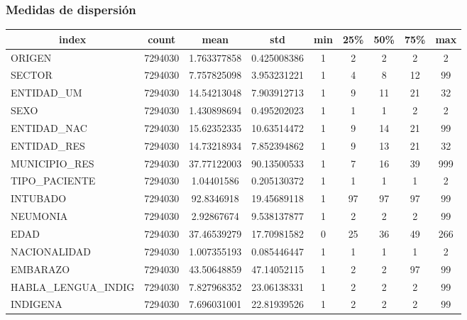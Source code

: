 \subsubsection{Medidas de dispersión}
\begin{table}[h]
\resizebox{15cm}{!} {

\begin{tabular}{|l|c|c|c|c|c|c|c|c|}
\hline
\multicolumn{1}{|c|}{\textbf{index}} & \textbf{count} & \textbf{mean} & \textbf{std} & \textbf{min} & \textbf{25\%} & \textbf{50\%} & \textbf{75\%} & \textbf{max} \\ \hline
ORIGEN                  & 7294030 & 1.763377858 & 0.425008386 & 1 & 2  & 2  & 2  & 2   \\ \hline
SECTOR                  & 7294030 & 7.757825098 & 3.953231221 & 1 & 4  & 8  & 12 & 99  \\ \hline
ENTIDAD\_UM             & 7294030 & 14.54213048 & 7.903912713 & 1 & 9  & 11 & 21 & 32  \\ \hline
SEXO                    & 7294030 & 1.430898694 & 0.495202023 & 1 & 1  & 1  & 2  & 2   \\ \hline
ENTIDAD\_NAC            & 7294030 & 15.62352335 & 10.63514472 & 1 & 9  & 14 & 21 & 99  \\ \hline
ENTIDAD\_RES            & 7294030 & 14.73218934 & 7.852394862 & 1 & 9  & 13 & 21 & 32  \\ \hline
MUNICIPIO\_RES          & 7294030 & 37.77122003 & 90.13500533 & 1 & 7  & 16 & 39 & 999 \\ \hline
TIPO\_PACIENTE          & 7294030 & 1.04401586  & 0.205130372 & 1 & 1  & 1  & 1  & 2   \\ \hline
INTUBADO                & 7294030 & 92.8346918  & 19.45689118 & 1 & 97 & 97 & 97 & 99  \\ \hline
NEUMONIA                & 7294030 & 2.92867674  & 9.538137877 & 1 & 2  & 2  & 2  & 99  \\ \hline
EDAD                    & 7294030 & 37.46539279 & 17.70981582 & 0 & 25 & 36 & 49 & 266 \\ \hline
NACIONALIDAD            & 7294030 & 1.007355193 & 0.085446447 & 1 & 1  & 1  & 1  & 2   \\ \hline
EMBARAZO                & 7294030 & 43.50648859 & 47.14052115 & 1 & 2  & 2  & 97 & 99  \\ \hline
HABLA\_LENGUA\_INDIG    & 7294030 & 7.827968352 & 23.06138331 & 1 & 2  & 2  & 2  & 99  \\ \hline
INDIGENA                & 7294030 & 7.696031001 & 22.81939526 & 1 & 2  & 2  & 2  & 99  \\ \hline

\end{tabular}}
\end{table}
